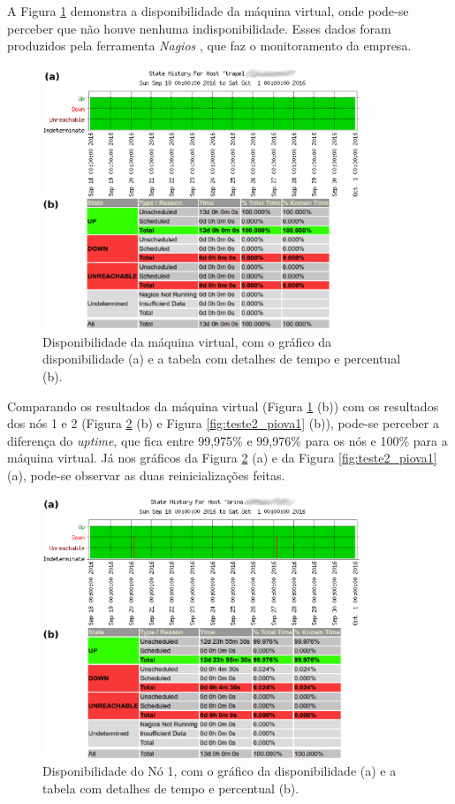 A Figura \ref{fig:teste2_trapel1} demonstra a disponibilidade da máquina virtual, onde pode-se perceber que não houve nenhuma indisponibilidade. 
Esses dados foram produzidos pela ferramenta \textit{Nagios} \cite{nagios}, que faz o monitoramento da empresa. 
\begin{figure}[h!]
 \centering
 \includegraphics[width=360px]{img/teste2_trapel1.eps}
 \caption{Disponibilidade da máquina virtual, com o gráfico da disponibilidade (a) e a tabela com detalhes de tempo e percentual (b).}
 \label{fig:teste2_trapel1}
\end{figure}

Comparando os resultados da máquina virtual (Figura \ref{fig:teste2_trapel1} (b)) com os resultados dos nós 1 e 2 (Figura \ref{fig:teste2_brina1} 
(b) e Figura \ref{fig:teste2_piova1} (b)), pode-se perceber a diferença do \textit{uptime}, que fica entre 99,975\% e 99,976\% para os nós e 
100\% para a máquina virtual. Já nos gráficos da Figura \ref{fig:teste2_brina1} (a) e da Figura \ref{fig:teste2_piova1} (a), pode-se observar 
as duas reinicializações feitas.
\begin{figure}[h!]
 \centering
 \includegraphics[width=360px]{img/teste2_brina1.eps}
 \caption{Disponibilidade do Nó 1, com o gráfico da disponibilidade (a) e a tabela com detalhes de tempo e percentual (b).}
 \label{fig:teste2_brina1}
\end{figure}

